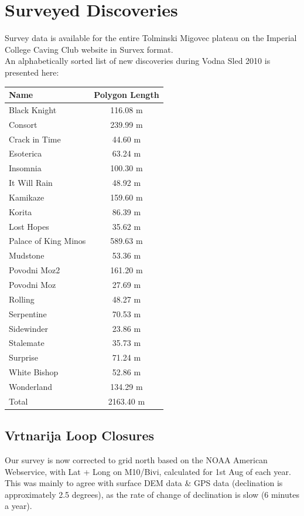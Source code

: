 \section{Surveyed Discoveries}

Survey data is available for the entire Tolminski Migovec plateau on the Imperial College Caving Club website in Survex format.\\

An alphabetically sorted list of new discoveries during Vodna Sled 2010 is presented here:\\

\begin{tabular}{l c}
Name & Polygon Length \\
\midrule
Black Knight & 116.08 m \\
Consort & 239.99 m \\
Crack in Time & 44.60 m \\
Esoterica & 63.24 m \\
Insomnia & 100.30 m \\
It Will Rain & 48.92 m \\
Kamikaze & 159.60 m \\
Korita & 86.39 m \\
Lost Hopes & 35.62 m \\
Palace of King Minos & 589.63 m \\
Mudstone & 53.36 m \\
Povodni Moz2 & 161.20 m \\
Povodni Moz & 27.69 m \\
Rolling & 48.27 m \\
Serpentine & 70.53 m \\
Sidewinder & 23.86 m \\
Stalemate & 35.73 m \\
Surprise & 71.24 m \\
White Bishop & 52.86 m \\
Wonderland & 134.29 m \\
\midrule
Total & 2163.40 m \\
\end{tabular}

\subsection{Vrtnarija Loop Closures}

Our survey is now corrected to grid north based on the NOAA American
Webservice, with Lat + Long on M10/Bivi, calculated for 1st Aug of each year.
This was mainly to agree with surface DEM data \& GPS data (declination is
approximately 2.5 degrees), as the rate of change of declination is slow (6
minutes a year).

